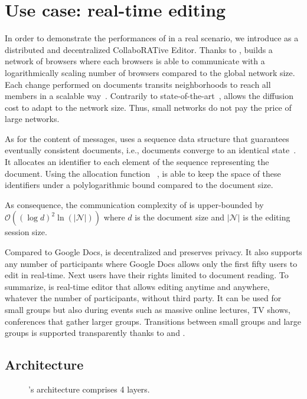 
\section{Use case: real-time editing}
\label{sec:use-case}

In order to demonstrate the performances of \SPRAY in a real scenario,
we introduce \CRATE as a distributed and decentralized CollaboRATive
Editor. Thanks to \SPRAY, \CRATE builds a network of
browsers where each browsers is able to communicate with a
logarithmically scaling number of browsers compared to the global
network size. Each change performed on documents transits
neighborhoods to reach all members in a scalable
way~\cite{birman1999bimodal}. Contrarily to
state-of-the-art~\cite{tolgyeski2009adaptive, voulgaris2005cyclon},
\SPRAY allows the diffusion cost to adapt to the network size. Thus,
small networks do not pay the price of large networks.

As for the content of messages, \CRATE uses a sequence data structure
that guarantees eventually consistent documents, i.e., documents
converge to an identical state~\cite{bailis2013eventual}. It allocates
an identifier to each element of the sequence representing the
document. Using the allocation function \LSEQ~\cite{nedelec2013lseq},
\CRATE is able to keep the space of these identifiers under a
polylogarithmic bound compared to the document size.

As consequence, the communication complexity of \CRATE is
upper-bounded by $\mathcal{O}((\log d)^2\ln(|\mathcal{N}|))$ where $d$
is the document size and $|\mathcal{N}|$ is the editing session size.

Compared to Google Docs, \CRATE is decentralized and preserves privacy. It also
supports any number of participants where Google Docs allows only the first
fifty users to edit in real-time. Next users have their rights limited to
document reading.  To summarize, \CRATE is real-time editor that allows editing
anytime and anywhere, whatever the number of participants, without third
party. It can be used for small groups but also during events such as massive
online lectures, TV shows, conferences that gather larger groups. Transitions
between small groups and large groups is supported transparently thanks to
\SPRAY and \LSEQ.

\subsection{Architecture}

\begin{figure}
  \centering
  
  \caption{\label{fig:architecture}\CRATE's architecture comprises 4
    layers.}
\end{figure}


